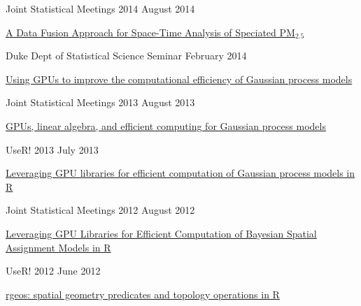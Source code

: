 \documentclass[margin,line]{res}
\begin{document}
\begin{resume}
Joint Statistical Meetings 2014 \hfill August 2014
\begin{list1}
\item[] \href{https://github.com/rundel/Presentations/tree/master/JSM%202014}{A Data Fusion Approach for Space-Time Analysis of Speciated PM$_{2.5}$}
\end{list1}
\vspace{-2mm}

Duke Dept of Statistical Science Seminar \hfill February 2014
\begin{list1}
\item[] \href{https://github.com/rundel/Presentations/tree/master/Duke%202014}{Using GPUs to improve the computational efficiency of Gaussian process models}
\end{list1}
\vspace{-2mm}


Joint Statistical Meetings 2013 \hfill August 2013
\begin{list1}
\item[] \href{https://github.com/rundel/Presentations/tree/master/JSM%202013}{GPUs, linear algebra, and efficient computing for Gaussian process models}
\end{list1}
\vspace{-2mm}

UseR! 2013 \hfill July 2013
\begin{list1}
\item[] \href{https://github.com/rundel/Presentations/tree/master/UseR2013}{Leveraging GPU libraries for efficient computation of Gaussian process models in R}
\end{list1}
\vspace{-2mm}

Joint Statistical Meetings 2012 \hfill August 2012
\begin{list1}
\item[] \href{https://github.com/rundel/Presentations/tree/master/JSM%202012}{Leveraging GPU Libraries for Efficient Computation of Bayesian Spatial Assignment Models in R}
\end{list1}
\vspace{-2mm}

UseR! 2012 \hfill June 2012
\begin{list1}
\item[] \href{https://github.com/rundel/Presentations/tree/master/UseR2012}{rgeos: spatial geometry predicates and topology operations in R}
\end{list1}
\vspace{-2mm}


\end{resume}
\end{document}
